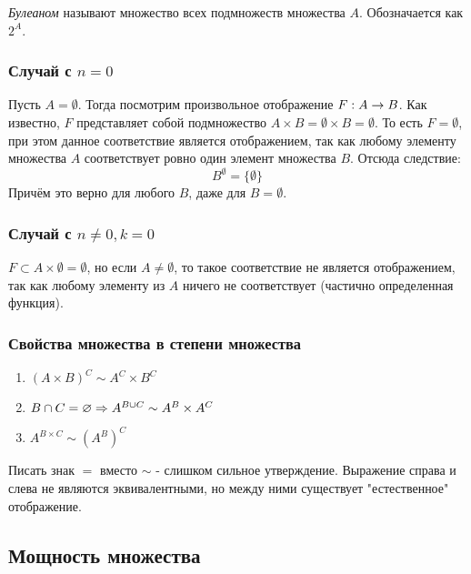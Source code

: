 \begin{definition}
	\textit{Булеаном} называют множество всех подмножеств множества $A$. Обозначается как $2^A$.
\end{definition}

\subsubsection*{Случай с $n = 0$}

Пусть $A = \emptyset$. Тогда посмотрим произвольное отображение $F : A \rightarrow B$. Как известно, $F$ представляет собой подмножество $A \times B = \emptyset \times B = \emptyset$. То есть $F = \emptyset$, при этом данное соответствие является отображением, так как любому элементу множества $A$ соответствует ровно один элемент множества $B$. Отсюда следствие:
$$
	B^{\emptyset} = \{\emptyset\}
$$
Причём это верно для любого $B$, даже для $B = \emptyset$.

\subsubsection*{Случай с $n \neq 0, k = 0$}

$F \subset A \times \emptyset = \emptyset$, но если $A \neq \emptyset$, то такое соответствие не является отображением, так как любому элементу из $A$ ничего не соответствует (частично определенная функция).

\subsubsection*{Свойства множества в степени множества}

\begin{enumerate}
	\item $(A \times B)^C \sim A^C \times B^C$
	\item $B \cap C = \varnothing \Rightarrow A^{B \cup C} \sim A^B \times A^C$
	\item $A^{B \times C} \sim (A^B)^C$
\end{enumerate}

\begin{note}
	Писать знак $=$ вместо $\sim$ - слишком сильное утверждение. Выражение справа и слева не являются эквивалентными, но между ними существует "естественное" отображение.
\end{note}

\subsection{Мощность множества}

